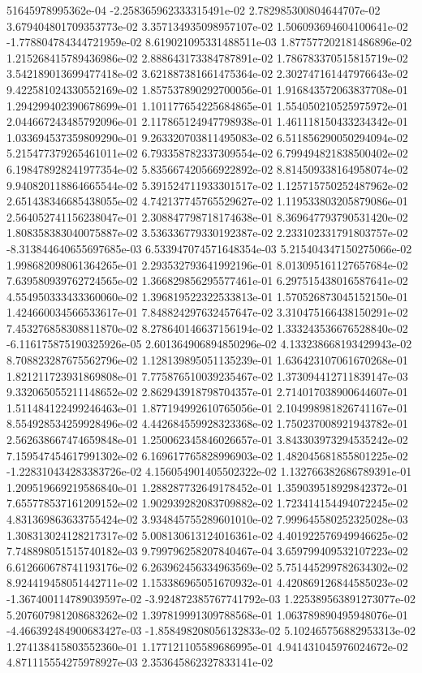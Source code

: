 51645978995362e-04	-2.258365962333315491e-02	2.782985300804644707e-02	3.679404801709353773e-02	3.357134935098957107e-02	1.506093694604100641e-02	-1.778804784344721959e-02	8.619021095331488511e-03	1.877577202181486896e-02	1.215268415789436986e-02	2.888643173384787891e-02	1.786783370515815719e-02	3.542189013699477418e-02	3.621887381661475364e-02	2.302747161447976643e-02	9.422581024330552169e-02	1.857537890292700056e-01	1.916843572063837708e-01	1.294299402390678699e-01	1.101177654225684865e-01	1.554050210525975972e-01	2.044667243485792096e-01	2.117865124947798938e-01	1.461118150433234342e-01	1.033694537359809290e-01	9.263320703811495083e-02	6.511856290050294094e-02	5.215477379265461011e-02	6.793358782337309554e-02	6.799494821838500402e-02	6.198478928241977354e-02	5.835667420566922892e-02	8.814509338164958074e-02	9.940820118864665544e-02	5.391524711933301517e-02	1.125715750252487962e-02	2.651438346685438055e-02	4.742137745765529627e-02	1.119533803205879086e-01	2.564052741156238047e-01	2.308847798718174638e-01	8.369647793790531420e-02	1.808358383040075887e-02	3.536336779330192387e-02	2.233102331791803757e-02	-8.313844640655697685e-03	6.533947074571648354e-03	5.215404347150275066e-02	1.998682098061364265e-01	2.293532793641992196e-01	8.013095161127657684e-02	7.639580939762724565e-02	1.366829856295577461e-01	6.297515438016587641e-02	4.554950333433360060e-02	1.396819522322533813e-01	1.570526873045152150e-01	1.424660034566533617e-01	7.848824297632457647e-02	3.310475166438150291e-02	7.453276858308811870e-02	8.278640146637156194e-02	1.333243536676528840e-02	-6.116175875190325926e-05	2.601364906894850296e-02	4.133238668193429943e-02	8.708823287675562796e-02	1.128139895051135239e-01	1.636423107061670268e-01	1.821211723931869808e-01	7.775876510039235467e-02	1.373094412711839147e-03	9.332065055211148652e-02	2.862943918798704357e-01	2.714017038900644607e-01	1.511484122499246463e-01	1.877194992610765056e-01	2.104998981826741167e-01	8.554928534259928496e-02	4.442684559928323368e-02	1.750237008921943782e-01	2.562638667474659848e-01	1.250062345846026657e-01	3.843303973294535242e-02	7.159547454617991302e-02	6.169617765828996903e-02	1.482045681855801225e-02	-1.228310434283383726e-02	4.156054901405502322e-02	1.132766382686789391e-01	1.209519669219586840e-01	1.288287732649178452e-01	1.359039518929842372e-01	7.655778537161209152e-02	1.902939282083709882e-02	1.723414154494072245e-02	4.831369863633755424e-02	3.934845755289601010e-02	7.999645580252325028e-03	1.308313024128217317e-02	5.008130613124016361e-02	4.401922576949946625e-02	7.748898051515740182e-03	9.799796258207840467e-04	3.659799409532107223e-02	6.612660678741193176e-02	6.263962456334963569e-02	5.751445299782634302e-02	8.924419458051442711e-02	1.153386965051670932e-01	4.420869126844585023e-02	-1.367400114789039597e-02	-3.924872385767741792e-03	1.225389563891273077e-02	5.207607981208683262e-02	1.397819991309788568e-01	1.063789890495948076e-01	-4.466392484900683427e-03	-1.858498208056132833e-02	5.102465756882953313e-02	1.274138415803552360e-01	1.177121105589686995e-01	4.941431045976024672e-02	4.871115554275978927e-03	2.353645862327833141e-02

